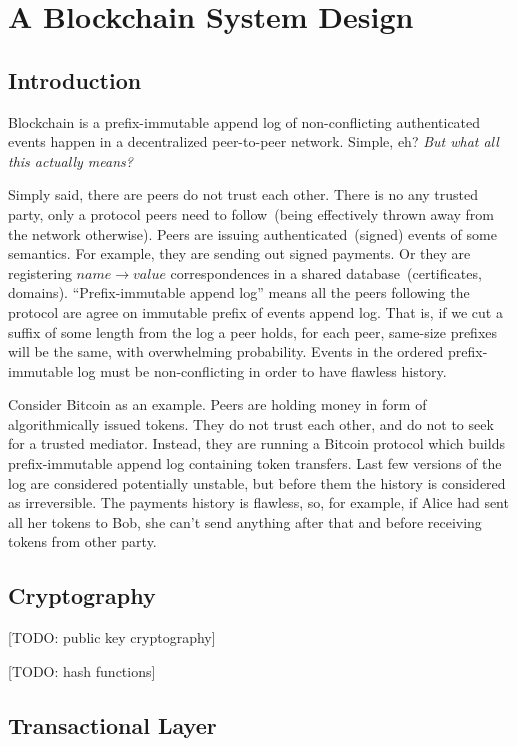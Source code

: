 \documentclass[]{report}   %
\begin{document}
\chapter{A Blockchain System Design}             %
\section{Introduction}     

Blockchain is a prefix-immutable append log of non-conflicting authenticated events happen in a decentralized peer-to-peer network. Simple, eh? \textit{But what all this actually means?}

Simply said, there are peers do not trust each other. There is no any trusted party, only a protocol peers need to follow~(being effectively thrown away from the network otherwise). Peers are issuing authenticated~(signed) events of some semantics. For example, they are sending out signed payments. Or they are registering \(name \rightarrow value\) correspondences in a shared database~(certificates, domains). ``Prefix-immutable append log'' means all the peers following the protocol are agree on immutable prefix of events append log. That is, if we cut a suffix of some length from the log a peer holds, for each peer, same-size prefixes will be the same, with overwhelming probability. Events in the ordered prefix-immutable log must be non-conflicting in order to have flawless history.

Consider Bitcoin as an example. Peers are holding money in form of algorithmically issued tokens. They do not trust each other, and do not to seek for a trusted mediator. Instead, they are running a Bitcoin protocol which builds prefix-immutable append log containing token transfers. Last few versions of the log are considered potentially unstable, but before them the history is considered as irreversible. The payments history is flawless, so, for example, if Alice had sent all her tokens to Bob, she can't send anything after that and before receiving tokens from other party.

\section{Cryptography}

[TODO: public key cryptography]

[TODO: hash functions]


\section{Transactional Layer}
\end{document}
